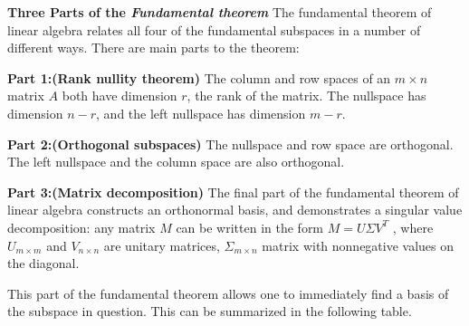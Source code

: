 \documentclass[
  letterpaper,
  DIV=11,
  numbers=noendperiod]{scrreprt}
\theoremstyle{plain}
\theoremstyle{definition}
\theoremstyle{remark}
\begin{document}
\begin{tcolorbox}[enhanced jigsaw, rightrule=.15mm, arc=.35mm, breakable, colback=white, toprule=.15mm, colframe=quarto-callout-important-color-frame, toptitle=1mm, opacityback=0, colbacktitle=quarto-callout-important-color!10!white, opacitybacktitle=0.6, title=\textcolor{quarto-callout-important-color}{\faExclamation}\hspace{0.5em}{Important}, bottomrule=.15mm, left=2mm, titlerule=0mm, coltitle=black, bottomtitle=1mm, leftrule=.75mm]

\textbf{Three Parts of the \emph{Fundamental theorem}} The fundamental
theorem of linear algebra relates all four of the fundamental subspaces
in a number of different ways. There are main parts to the theorem:

\textbf{Part 1:(Rank nullity theorem)} The column and row spaces of an
\(m\times n\) matrix \(A\) both have dimension \(r\), the rank of the
matrix. The nullspace has dimension \(n−r\), and the left nullspace has
dimension \(m−r\).

\textbf{Part 2:(Orthogonal subspaces)} The nullspace and row space are
orthogonal. The left nullspace and the column space are also orthogonal.

\textbf{Part 3:(Matrix decomposition)} The final part of the fundamental
theorem of linear algebra constructs an orthonormal basis, and
demonstrates a singular value decomposition: any matrix \(M\) can be
written in the form \(M=U\Sigma V^T\) , where \(U_{m\times m}\) and
\(V_{n\times n}\) are unitary matrices, \(\Sigma_{m\times n}\) matrix
with nonnegative values on the diagonal.

This part of the fundamental theorem allows one to immediately find a
basis of the subspace in question. This can be summarized in the
following table.


\end{tcolorbox}
\end{document}
